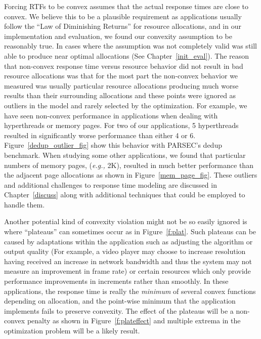 Forcing RTFs to be convex assumes that the actual response times are
close to convex. We believe this to be a plausible requirement as applications usually follow the ``Law of Diminishing Returns'' for resource allocations, and in our implementation and evaluation, we found our convexity assumption to be reasonably true. In cases where the assumption was not completely valid \pacora was still able to produce near optimal allocations (See Chapter~\ref{init_eval}).  The reason that non-convex response time versus resource behavior did not result in bad resource allocations was that for the most part the non-convex behavior we measured was usually particular resource allocations producing much worse results than their surrounding allocations and these points were ignored as outliers in the model and rarely selected by the optimization.  For example, we have seen non-convex performance in applications when dealing with hyperthreads or memory pages.  For two of our applications, 5 hyperthreads resulted in significantly worse performance than either 4 or 6. Figure~\ref{dedup_outlier_fig} show this behavior with PARSEC's dedup benchmark.   When studying some other applications, we found that particular numbers of memory pages, (\emph{e.g.,} 2K), resulted in much better performance than the adjacent page allocations as shown in Figure~\ref{mem_page_fig}.  These outliers and additional challenges to response time modeling are discussed in Chapter~\ref{discuss} along with additional techniques that could be employed to handle them.


Another potential kind of convexity violation might not be so easily ignored is where ``plateaus'' can sometimes occur as in Figure~\ref{f:plat}. Such plateaus can be caused by adaptations within the application such as adjusting the algorithm or output quality (For example, a video player may choose to increase resolution having received an increase in network bandwidth and thus the system may not measure an improvement in frame rate) or certain resources which only provide performance improvements in increments rather than smoothly.
In these applications, the response time is really the \emph{minimum} of several convex functions depending on allocation, and the point-wise minimum that the application implements fails to preserve convexity.  The effect of the plateaus will be a non-convex penalty as shown in Figure~\ref{f:plateffect} and multiple extrema in the optimization problem will be a likely result. 


